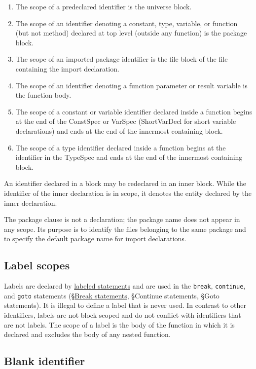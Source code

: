{\begin{enumerate}
\item
  The scope of a predeclared identifier is the universe block.
\item
  The scope of an identifier denoting a constant, type, variable, or
  function (but not method) declared at top level (outside any function)
  is the package block.
\item
  The scope of an imported package identifier is the file block of the
  file containing the import declaration.
\item
  The scope of an identifier denoting a function parameter or result
  variable is the function body.
\item
  The scope of a constant or variable identifier declared inside a
  function begins at the end of the ConstSpec or VarSpec (ShortVarDecl
  for short variable declarations) and ends at the end of the innermost
  containing block.
\item
  The scope of a type identifier declared inside a function begins at
  the identifier in the TypeSpec and ends at the end of the innermost
  containing block.
\end{enumerate}

An identifier declared in a block may be redeclared in an inner block.
While the identifier of the inner declaration is in scope, it denotes
the entity declared by the inner declaration.

The package clause is not a declaration; the
package name does not appear in any scope. Its purpose is to identify
the files belonging to the same package and to
specify the default package name for import declarations.

\subsection*{Label scopes}

Labels are declared by \hyperref[Labeled\_statements]{labeled
statements} and are used in the \texttt{break}, \texttt{continue}, and
\texttt{goto} statements (§\hyperref[Break\_statements]{Break
statements}, §Continue statements,
§Goto statements). It is illegal to define
a label that is never used. In contrast to other identifiers, labels are
not block scoped and do not conflict with identifiers that are not
labels. The scope of a label is the body of the function in which it is
declared and excludes the body of any nested function.

\subsection*{Blank identifier}

}
